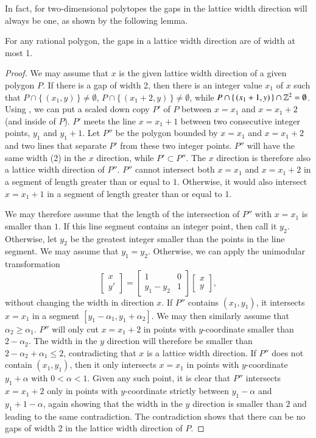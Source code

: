 In fact, for two-dimensional polytopes the gaps in the lattice
width direction will always be one, as shown by the following lemma.
\begin{lemma}
\label{l:gap}
For any rational polygon, the gaps in a lattice
width direction are of width at most 1.
\end{lemma}
\begin{proof}
We may assume that $x$ is the given lattice width direction of
a given polygon $P$.
If there is a gap of width 2, then there is an integer value $x_1$ of $x$
such that
$P \cap \{\, (x_1, y) \,\} \ne \emptyset$,
$P \cap \{\, (x_1+2, y) \,\} \ne \emptyset$,
while
$P \cap \{\, (x_1+1, y) \,\} \cap \mathbb{Z}^2 = \emptyset$.
Using , we can put
a scaled down copy $P'$ of $P$ between $x=x_1$ and $x=x_1+2$
(and inside of $P$).
$P'$ meets the line $x=x_1+1$ between two consecutive integer
points, $y_1$ and $y_1+1$.  Let $P''$ be the polygon bounded by $x=x_1$ and
$x=x_1+2$ and two lines that separate $P'$ from these two
integer points.
$P''$ will have the same width (2) in the
$x$ direction, while $P' \subset P''$.
The $x$ direction is therefore also a lattice width direction of $P''$.
$P''$ cannot intersect both $x=x_1$ and $x=x_1+2$ in a segment of
length greater than or equal to $1$.
Otherwise, it would also intersect $x=x_1+1$ in a segment of length
greater than or equal to $1$.

We may therefore assume that the length of the intersection
of $P''$ with $x=x_1$ is smaller than $1$.
If this line segment contains an integer point, then call it $y_2$.
Otherwise, let $y_2$ be the greatest integer smaller than the
points in the line segment.
We may assume that $y_1 = y_2$.
Otherwise, we can apply the unimodular transformation
$$
\begin{bmatrix}
x \\
y'
\end{bmatrix}
=
\begin{bmatrix}
1 & 0 \\
y_1 - y_2 & 1
\end{bmatrix}
\begin{bmatrix}
x \\
y
\end{bmatrix}
,
$$
without changing the width in direction $x$.
If $P''$ contains $(x_1, y_1)$, it intersects $x=x_1$
in a segment $[y_1-\alpha_1, y_1+\alpha_2]$.
We may then similarly assume that $\alpha_2 \ge \alpha_1$.
$P''$ will only cut $x=x_1+2$ in points with $y$-coordinate
smaller than $2-\alpha_2$.  The width in the $y$ direction
will therefore be smaller than $2-\alpha_2+\alpha_1 \le 2$,
contradicting that $x$ is a lattice width direction.
If $P''$ does not contain $(x_1, y_1)$, then it only
intersects $x=x_1$ in points with $y$-coordinate $y_1+\alpha$
with $0 < \alpha < 1$.  Given any such point, it is clear
that $P''$ intersects $x=x_1+2$ only in points with $y$-coordinate
strictly between $y_1-\alpha$ and $y_1+1-\alpha$, again
showing that the width in the $y$ direction is smaller than $2$ and
leading to the same contradiction.
The contradiction shows that there can be no gaps
of width 2 in the lattice width direction of $P$.
\end{proof}

